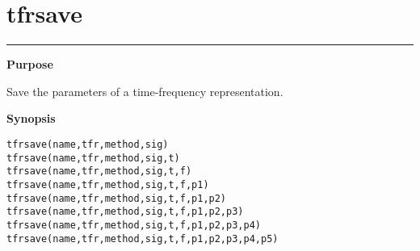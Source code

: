 


\section*{\hspace*{-1.6cm} tfrsave}

\vspace*{-.4cm}
\hspace*{-1.6cm}\rule[0in]{16.5cm}{.02cm}
\vspace*{.2cm}

{\bf \large \sf Purpose}\\
\hspace*{1.5cm}
\begin{minipage}[t]{13.5cm}
Save the parameters of a time-frequency representation.
\end{minipage}
\vspace*{.3cm}

{\bf \large \sf Synopsis}\\
\hspace*{1.5cm}
\begin{minipage}[t]{13.5cm}
\begin{verbatim}
tfrsave(name,tfr,method,sig)
tfrsave(name,tfr,method,sig,t)
tfrsave(name,tfr,method,sig,t,f)
tfrsave(name,tfr,method,sig,t,f,p1)
tfrsave(name,tfr,method,sig,t,f,p1,p2)
tfrsave(name,tfr,method,sig,t,f,p1,p2,p3)
tfrsave(name,tfr,method,sig,t,f,p1,p2,p3,p4)
tfrsave(name,tfr,method,sig,t,f,p1,p2,p3,p4,p5)
\end{verbatim}
\end{minipage}
\vspace*{.4cm}

